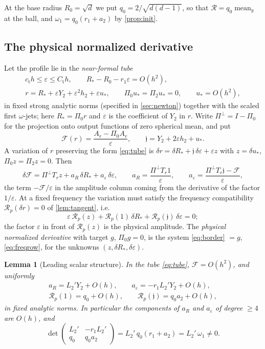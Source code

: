 \documentclass[11pt]{amsart}
\numberwithin{equation}{section}
\newtheorem{lemma}[theorem]{Lemma}
\theoremstyle{definition}
\theoremstyle{remark}
\newcommand{\eps}{\varepsilon}
\newcommand{\mean}{\operatorname{mean}}
\newcommand{\cR}{\mathcal R}
\newcommand{\cF}{\mathcal F}
\begin{document}
At the base radius $R_0=\sqrt d$ we put $q_0=2/\sqrt{d(d-1)}$, so that $\cR=q_0\mean_y$ at the ball, and $\omega_1=q_0(r_1+a_2)$ by \cref{prop:init}.

\subsection{The physical normalized derivative}
Let the profile lie in the \emph{near-formal tube}
\begin{equation}\label{eq:tube}
\begin{gathered}
c_{\mathrm t}h\le\eps\le C_{\mathrm t}h,\qquad R_*-R_0-r_1\eps=O(h^2),\\
r=R_*+\eps Y_2+\eps^2h_2+\eps u_*,\qquad \Pi_0u_*=\Pi_2u_*=0,\qquad u_*=O(h^2),
\end{gathered}
\end{equation}
in fixed strong analytic norms (specified in \cref{sec:newton}) together with the scaled first $\omega$-jets; here $R_*=\Pi_0r$ and $\eps$ is the coefficient of $Y_2$ in $r$. Write $\Pi^\perp=I-\Pi_0$ for the projection onto output functions of zero spherical mean, and put
\[
\cF(r)=\frac{A_r-\Pi_0A_r}{\eps},\qquad\mathfrak j=Y_2+2\eps h_2+u_* .
\]
A variation of $r$ preserving the form \eqref{eq:tube} is $\delta r=\delta R_*+\mathfrak j\,\delta\eps+\eps z$ with $z=\delta u_*$, $\Pi_0z=\Pi_2z=0$. Then
\begin{equation}\label{eq:border}
\delta\cF=\Pi^\perp T_rz+a_R\,\delta R_*+a_\eps\,\delta\eps,\qquad a_R=\frac{\Pi^\perp T_r1}\eps,\qquad a_\eps=\frac{\Pi^\perp T_r\mathfrak j-\cF}\eps ,
\end{equation}
the term $-\cF/\eps$ in the amplitude column coming from the derivative of the factor $1/\eps$. At a fixed frequency the variation must satisfy the frequency compatibility $\cR_p(\delta r)=0$ of \cref{lem:tangent}, i.e.
\begin{equation}\label{eq:freqrow}
\eps\,\cR_p(z)+\cR_p(1)\,\delta R_*+\cR_p(\mathfrak j)\,\delta\eps=0 ;
\end{equation}
the factor $\eps$ in front of $\cR_p(z)$ is the physical amplitude. The \emph{physical normalized derivative} with target $g$, $\Pi_0g=0$, is the system \eqref{eq:border} $=g$, \eqref{eq:freqrow}, for the unknowns $(z,\delta R_*,\delta\eps)$.

\begin{lemma}[Leading scalar structure]\label{lem:scalar}
In the tube \eqref{eq:tube}, $\cF=O(h^2)$, and uniformly
\begin{gather*}
a_R=L_2'Y_2+O(h),\qquad a_\eps=-r_1L_2'Y_2+O(h),\\
\cR_p(1)=q_0+O(h),\qquad\cR_p(\mathfrak j)=q_0a_2+O(h),
\end{gather*}
in fixed analytic norms. In particular the components of $a_R$ and $a_\eps$ of degree $\ge4$ are $O(h)$, and
\begin{equation}\label{eq:scalarmatrix}
\det\begin{pmatrix}L_2'&-r_1L_2'\\ q_0&q_0a_2\end{pmatrix}=L_2'\,q_0(r_1+a_2)=L_2'\,\omega_1\ne0 .
\end{equation}
\end{lemma}
\end{document}
